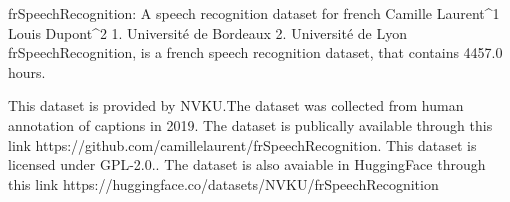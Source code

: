 
frSpeechRecognition: A speech recognition dataset for french
Camille Laurent^1 Louis Dupont^2
1. Université de Bordeaux 2. Université de Lyon
frSpeechRecognition, is a french speech recognition dataset, that contains 4457.0 hours.

This dataset is provided by NVKU.The dataset was collected from human annotation of captions in 2019. 
The dataset is publically available through this link https://github.com/camillelaurent/frSpeechRecognition. This dataset is licensed under GPL-2.0..
The dataset is also avaiable in HuggingFace through this link https://huggingface.co/datasets/NVKU/frSpeechRecognition
